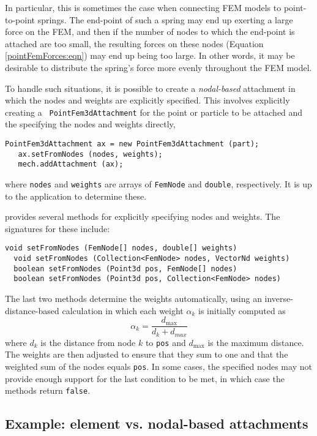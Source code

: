 In particular, this is sometimes the case when connecting FEM models
to point-to-point springs. The end-point of such a spring may end up
exerting a large force on the FEM, and then if the number of nodes to
which the end-point is attached are too small, the resulting forces on
these nodes (Equation \ref{pointFemForces:eqn}) may end up being too
large. In other words, it may be desirable to distribute the spring's
force more evenly throughout the FEM model. 

To handle such situations, it is possible to create a {\it
nodal-based} attachment in which the nodes and weights are explicitly
specified. This involves explicitly creating a {\tt
PointFem3dAttachment} for the point or particle to be attached and the
specifying the nodes and weights directly,
%
\begin{lstlisting}[]
   PointFem3dAttachment ax = new PointFem3dAttachment (part);
   ax.setFromNodes (nodes, weights);
   mech.addAttachment (ax);
\end{lstlisting}
%
where {\tt nodes} and {\tt weights} are arrays of {\tt FemNode} and
{\tt double}, respectively. It is up to the application to determine
these.

 provides
several methods for explicitly specifying nodes and weights. The
signatures for these include:
\begin{lstlisting}[]
  void setFromNodes (FemNode[] nodes, double[] weights)
  void setFromNodes (Collection<FemNode> nodes, VectorNd weights)
  boolean setFromNodes (Point3d pos, FemNode[] nodes)
  boolean setFromNodes (Point3d pos, Collection<FemNode> nodes)
\end{lstlisting}
The last two methods determine the weights automatically, using an
inverse-distance-based calculation in which each weight $\alpha_k$
is initially computed as
%
\begin{equation}
\alpha_k = \frac{d_{\text{max}}}{d_k + d_{max}}
\label{invDistWeights:eqn}
\end{equation}
%
where $d_k$ is the distance from node $k$ to {\tt pos} and
$d_{\text{max}}$ is the maximum distance. The weights are then
adjusted to ensure that they sum to one and that the weighted sum of
the nodes equals {\tt pos}. In some cases, the specified nodes
may not provide enough support for the last condition to be
met, in which case the methods return {\tt false}.

\subsection{Example: element vs. nodal-based attachments}


